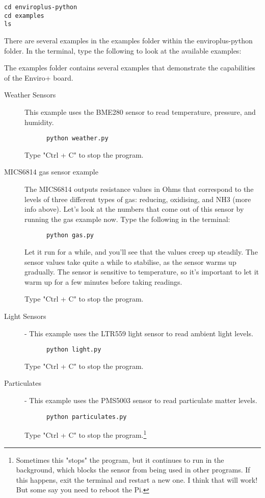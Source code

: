 \documentclass{article}
\begin{document}
\begin{verbatim}
cd enviroplus-python
cd examples
ls
\end{verbatim}

There are several examples in the examples folder within the enviroplus-python folder. In the terminal, type the following to look at the available examples:

The examples folder contains several examples that demonstrate the capabilities of the Enviro+ board.

\begin{description}
  \item[Weather Sensors] This example uses the BME280 sensor to read temperature, pressure, and humidity.
  
  \begin{verbatim}
      python weather.py
  \end{verbatim} 
  
  Type "Ctrl + C" to stop the program.
  
  \item[MICS6814 gas sensor example] The MICS6814 outputs resistance values in Ohms that correspond to the levels of three different types of gas: reducing, oxidising, and NH3 (more info above). Let's look at the numbers that come out of this sensor by running the gas example now. Type the following in the terminal:
  
  \begin{verbatim}
      python gas.py
  \end{verbatim}
  
Let it run for a while, and you'll see that the values creep up steadily. The sensor values take quite a while to stabilise, as the sensor warms up gradually. The sensor is sensitive to temperature, so it's important to let it warm up for a few minutes before taking readings.

Type "Ctrl + C" to stop the program.

\item[Light Sensors] - This example uses the LTR559 light sensor to read ambient light levels.

\begin{verbatim}
      python light.py
\end{verbatim}

Type "Ctrl + C" to stop the program.

\item[Particulates] - This example uses the PMS5003 sensor to read particulate matter levels.

\begin{verbatim}
      python particulates.py
\end{verbatim}

Type "Ctrl + C" to stop the program.\footnote{Sometimes this "stops" the program, but it continues to run in the background, which blocks the sensor from being used in other programs. If this happens, exit the terminal and restart a new one. I think that will work! But some say you need to reboot the Pi.}
  
\end{description}
\end{document}
